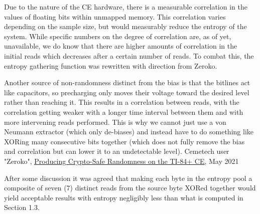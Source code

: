 \documentclass[titlepage]{article}
\begin{document}
		Due to the nature of the CE hardware, there is a measurable correlation in the values of floating bits within unmapped memory. This correlation varies depending on the sample size, but would measurably reduce the entropy of the system. While specific numbers on the degree of correlation are, as of yet, unavailable, we do know that there are higher amounts of correlation in the initial reads which decreases after a certain number of reads. To combat this, the entropy gathering function was rewritten with direction from Zeroko.
		\begin{newquote}
		Another source of non-randomness distinct from the bias is that the bitlines act like capacitors, so precharging only moves their voltage toward the desired level rather than reaching it. This results in a correlation between reads, with the correlation getting weaker with a longer time interval between them and with more intervening reads performed. This is why we cannot just use a von Neumann extractor (which only de-biases) and instead have to do something like XORing many consecutive bits together (which does not fully remove the bias and correlation but can lower it to an undetectable level). 
		\tcblower
		Cemetech user "Zeroko", \underline{\href{https://www.cemetech.net/forum/viewtopic.php?p=293079}{Producing Crypto-Safe Randomness on the TI-84+ CE}}, May 2021
		\end{newquote}
		After some discussion it was agreed that making each byte in the entropy pool a composite of seven (7) distinct reads from the source byte XORed together would yield acceptable results with entropy negligibly less than what is computed in Section 1.3.
		
\end{document}
